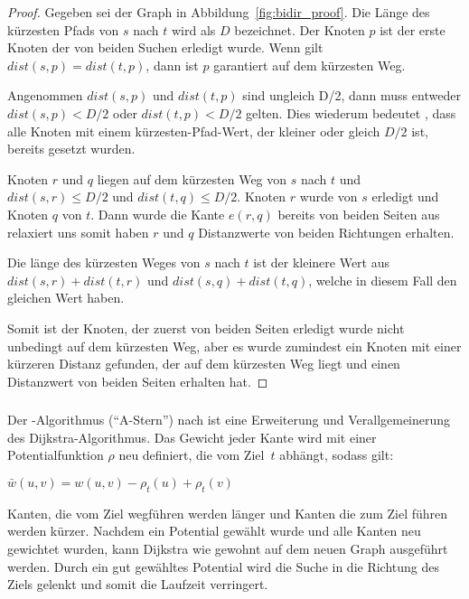 \begin{proof}
    Gegeben sei der Graph in Abbildung~\ref{fig:bidir_proof}. Die Länge des kürzesten Pfads von $s$
    nach $t$ wird als $D$ bezeichnet. Der Knoten $p$ ist der erste Knoten der von beiden Suchen
    erledigt wurde. Wenn gilt $dist(s,p) = dist(t,p)$, dann ist $p$ garantiert auf dem kürzesten Weg.

    Angenommen $dist(s,p)$ und $dist(t,p)$ sind ungleich D/2, dann muss entweder ${dist(s,p) < D/2}$
    oder $dist(t,p) < D/2$ gelten. Dies wiederum bedeutet , dass alle Knoten mit einem
    kürzesten-Pfad-Wert, der kleiner oder gleich $D/2$ ist, bereits gesetzt wurden.

    Knoten $r$ und $q$ liegen auf dem kürzesten Weg von $s$ nach $t$ und ${dist(s,r) \le D/2}$ und
    ${dist(t,q) \le D/2}$. Knoten $r$ wurde von $s$ erledigt und Knoten $q$ von $t$. Dann wurde die
    Kante $e(r,q)$ bereits von beiden Seiten aus relaxiert uns somit haben $r$ und $q$ Distanzwerte
    von beiden Richtungen erhalten.

    Die länge des kürzesten Weges von $s$ nach $t$ ist der kleinere Wert aus ${dist(s,r) + dist(t,r)}$
    und ${dist(s,q) + dist(t,q)}$, welche in diesem Fall den gleichen Wert haben.

    Somit ist der Knoten, der zuerst von beiden Seiten erledigt wurde nicht unbedingt auf dem
    kürzesten Weg, aber es wurde zumindest ein Knoten mit einer kürzeren Distanz gefunden, der auf
    dem kürzesten Weg liegt und einen Distanzwert von beiden Seiten erhalten hat.
\end{proof}

\subsubsection{\astar}
Der \astar-Algorithmus ("`A-Stern"') nach \cite{Hart.1968} ist eine Erweiterung und
Verallgemeinerung des Dijkstra-Algorithmus. Das Gewicht jeder Kante wird mit einer Potentialfunktion
$\rho$ neu definiert, die vom Ziel~$t$ abhängt, sodass gilt:
\begin{definition}
    $\bar{w}(u,v)=w(u,v)-\rho_t (u)+\rho_t (v)$
\end{definition}
Kanten, die vom Ziel wegführen werden länger und Kanten die zum Ziel führen werden kürzer. Nachdem
ein Potential gewählt wurde und alle Kanten neu gewichtet wurden, kann Dijkstra wie gewohnt auf dem
neuen Graph ausgeführt werden. Durch ein gut gewähltes Potential wird die Suche in die Richtung des
Ziels gelenkt und somit die Laufzeit verringert.\\

